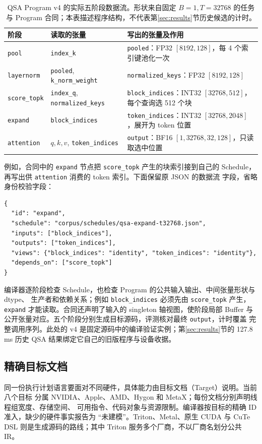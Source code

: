 \documentclass[UTF8,11pt,a4paper,fontset=none]{ctexart}
\renewcommand{\arraystretch}{1.34}
\newcommand{\code}[1]{\texttt{#1}}
\begin{document}
\begin{table}[htbp]
\centering\small\renewcommand{\arraystretch}{1.2}
\caption{QSA Program v4 的实际五阶段数据流。形状来自固定 $B=1,T=32768$ 的任务与
Program 合同；本表描述程序结构，不代表第\ref{sec:results}节历史候选的计时。}
\label{tab:qsa-program}
\begin{tabularx}{\textwidth}{@{}p{21mm}Y Y@{}}
\toprule
{}阶段 & 读取的张量 & 写出的张量及作用 \\
\midrule
\code{pool} & \code{index\_k} & \code{pooled}：FP32 $[8192,128]$，每 4 个索引键池化一次 \\
\code{layernorm} & \code{pooled}, \code{k\_norm\_weight} & \code{normalized\_keys}：FP32 $[8192,128]$ \\
\code{score\_topk} & \code{index\_q}, \code{normalized\_keys} & \code{block\_indices}：INT32 $[32768,512]$，每个查询选 512 个块 \\
\code{expand} & \code{block\_indices} & \code{token\_indices}：INT32 $[32768,2048]$，展开为 token 位置 \\
\code{attention} & $q,k,v$, \code{token\_indices} & \code{output}：BF16 $[1,32768,32,128]$，只读取选中位置 \\
\bottomrule
\end{tabularx}
\end{table}
\FloatBarrier

例如，合同中的 \code{expand} 节点把 \code{score\_topk} 产生的块索引接到自己的
Schedule，再写出供 \code{attention} 消费的 token 索引。下面保留原 JSON 的数据流
字段，省略身份校验字段：
\begin{lstlisting}[style=reportcode]
{
  "id": "expand",
  "schedule": "corpus/schedules/qsa-expand-t32768.json",
  "inputs": ["block_indices"],
  "outputs": ["token_indices"],
  "views": {"block_indices": "identity", "token_indices": "identity"},
  "depends_on": ["score_topk"]
}
\end{lstlisting}

编译器逐阶段检查 Schedule，也检查 Program 的公共输入输出、中间张量形状与 dtype、
生产者和依赖关系；例如 \code{block\_indices} 必须先由 \code{score\_topk} 产生，
\code{expand} 才能读取。合同还声明了输入的 singleton 轴视图，使阶段局部 Buffer
与公开张量对应。五个阶段分别生成目标源码，评测核对最终 \code{output}，计时覆盖
完整调用序列。此处的 v4 是固定源码中的编译验证实例；第\ref{sec:results}节的
127.8\,ms 历史 QSA 结果绑定它自己的旧版程序与设备收据。

\subsection{精确目标文档}
同一份执行计划语言要面对不同硬件，具体能力由目标文档（Target）说明。当前八个目标
分属 NVIDIA、Apple、AMD、Hygon 和 MetaX；每份文档分别声明线程组宽度、存储空间、
可用指令、代码对象与资源限制。编译器按目标的精确 ID 准入，缺少的硬件事实报告为
“未建模”。Triton、Metal、原生 CUDA 与 CuTe DSL 则是生成源码的路线；其中 Triton
服务多个厂商，不以厂商名划分公共 IR\cite{targets,architecture}。
\end{document}
